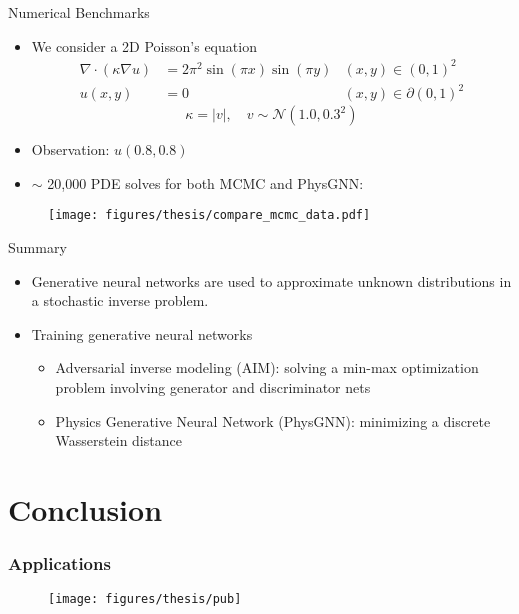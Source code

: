 \documentclass[usenames,dvipsnames]{beamer}
\begin{document}
\begin{frame}{Numerical Benchmarks}
	
	\begin{itemize}
		\item We consider a 2D Poisson's equation
\begin{equation}
	\begin{aligned}
		\nabla \cdot (\kappa\nabla u) &= 2\pi^2\sin(\pi x) \sin(\pi y) & (x,y)\in (0,1)^2\\
		u(x,y) &= 0 & (x,y)\in \partial (0,1)^2 
	\end{aligned}
\end{equation}
$$\kappa = |v|, \quad v \sim \mathcal{N}(1.0, 0.3^2)$$
\item Observation:  $u(0.8,0.8)$
\item $\sim$ 20,000 PDE solves for both MCMC and PhysGNN:
	\end{itemize}


\begin{figure}[hbt]
	\centering
    \texttt{[image: figures/thesis/compare\_mcmc\_data.pdf]}
\end{figure}

\end{frame}

\begin{frame}{Summary}
	\begin{itemize}
		\item Generative neural networks are used to approximate unknown distributions in a stochastic inverse problem. 
		\item Training generative neural networks
		\begin{itemize}
			\item Adversarial inverse modeling (AIM): solving a min-max optimization problem involving  generator and discriminator nets
			\item Physics Generative Neural Network (PhysGNN): minimizing a discrete Wasserstein distance
		\end{itemize}
	\end{itemize}
	
\end{frame}

\section{Conclusion}


\begin{frame}
	\frametitle{Applications}
	

\begin{figure}[hbt]
	\centering
	\texttt{[image: figures/thesis/pub]}
\end{figure}
\end{frame}
\end{document}
